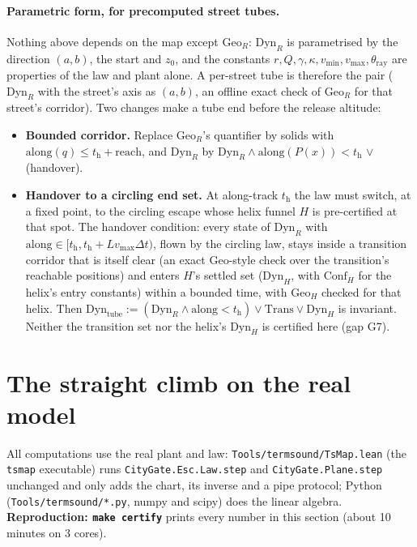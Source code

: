 \documentclass[11pt]{article}
\newcommand{\Conf}{\ensuremath{\mathrm{Conf}}}
\newcommand{\Geo}{\ensuremath{\mathrm{Geo}}}
\newcommand{\Dyn}{\ensuremath{\mathrm{Dyn}}}
\begin{document}
\paragraph{Parametric form, for precomputed street tubes.} Nothing above depends on the map except $\Geo_R$: $\Dyn_R$ is parametrised by the direction $(a, b)$, the start and $z_0$, and the constants $r, Q, \gamma, \kappa, v_{\min}, v_{\max}, \theta_{\mathrm{ray}}$ are properties of the law and plant alone. A per-street tube is therefore the pair ($\Dyn_R$ with the street's axis as $(a,b)$, an offline exact check of $\Geo_R$ for that street's corridor). Two changes make a tube end before the release altitude:
\begin{itemize}
\item \textbf{Bounded corridor.} Replace $\Geo_R$'s quantifier by solids with $\mathrm{along}(q) \le t_{\mathrm{h}} + \mathrm{reach}$, and $\Dyn_R$ by $\Dyn_R \wedge \mathrm{along}(P(x)) < t_{\mathrm{h}}$ $\vee$ (handover).
\item \textbf{Handover to a circling end set.} At along-track $t_{\mathrm h}$ the law must switch, at a fixed point, to the circling escape whose helix funnel $H$ is pre-certified at that spot. The handover condition: every state of $\Dyn_R$ with $\mathrm{along} \in [t_{\mathrm h}, t_{\mathrm h} + L v_{\max}\Delta t)$, flown by the circling law, stays inside a transition corridor that is itself clear (an exact $\Geo$-style check over the transition's reachable positions) and enters $H$'s settled set ($\Dyn_H$, with $\Conf_H$ for the helix's entry constants) within a bounded time, with $\Geo_H$ checked for that helix. Then $\Dyn_{\mathrm{tube}} := (\Dyn_R \wedge \mathrm{along} < t_{\mathrm h}) \vee \mathrm{Trans} \vee \Dyn_H$ is invariant. Neither the transition set nor the helix's $\Dyn_H$ is certified here (gap G7).
\end{itemize}

\section{The straight climb on the real model}\label{sec:straight}

All computations use the real plant and law: \texttt{Tools/termsound/TsMap.lean} (the \texttt{tsmap} executable) runs \texttt{CityGate.Esc.Law.step} and \texttt{CityGate.Plane.step} unchanged and only adds the chart, its inverse and a pipe protocol; Python (\texttt{Tools/termsound/*.py}, numpy and scipy) does the linear algebra. \textbf{Reproduction: \texttt{make certify}} prints every number in this section (about 10 minutes on 3 cores).
\end{document}
